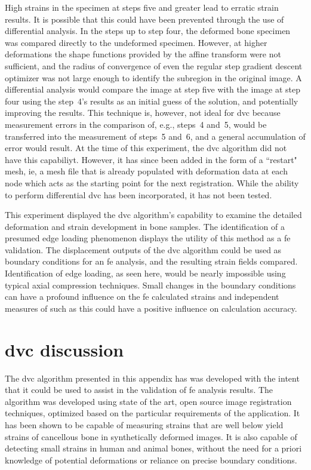 High strains in the specimen at steps five and greater lead to erratic strain results.
It is possible that this could have been prevented through the use of differential analysis.
In the steps up to step four, the deformed bone specimen was compared directly to the undeformed specimen.
However, at higher deformations the shape functions provided by the affine transform were not sufficient, and the radius of convergence of even the regular step gradient descent optimizer was not large enough to identify the subregion in the original image.
A differential analysis would compare the image at step five with the image at step four using the step~4's results as an initial guess of the solution, and potentially improving the results.
This technique is, however, not ideal for \ac{dvc} because measurement errors in the comparison of, e.g., steps~4 and~5, would be transferred into the measurement of steps~5 and~6, and a general accumulation of error would result.
At the time of this experiment, the \ac{dvc} algorithm did not have this capabiliyt.
However, it has since been added in the form of a ``restart" mesh, \ac{ie}, a mesh file that is already populated with deformation data at each node which acts as the starting point for the next registration.
While the ability to perform differential \ac{dvc} has been incorporated, it has not been tested.

This experiment displayed the \ac{dvc} algorithm's capability to examine the detailed deformation and strain development in bone samples.
The identification of a presumed edge loading phenomenon displays the utility of this method as a \acf{fe} validation.
The displacement outputs of the \ac{dvc} algorithm could be used as boundary conditions for an \ac{fe} analysis, and the resulting strain fields compared.
Identification of edge loading, as seen here, would be nearly impossible using typical axial compression techniques.
Small changes in the boundary conditions can have a profound influence on the \ac{fe} calculated strains and independent measures of such as this could have a positive influence on calculation accuracy.

\section{\acs*{dvc} discussion}
\label{sec:dvc_discussion}
The \acl{dvc} algorithm presented in this appendix has was developed with the intent that it could be used to assist in the validation of \ac{fe} analysis results.
The algorithm was developed using state of the art, open source image registration techniques, optimized based on the particular requirements of the application.
It has been shown to be capable of measuring strains that are well below yield strains of cancellous bone in synthetically deformed images.
It is also capable of detecting small strains in human and animal bones, without the need for a priori knowledge of potential deformations or reliance on precise boundary conditions.


